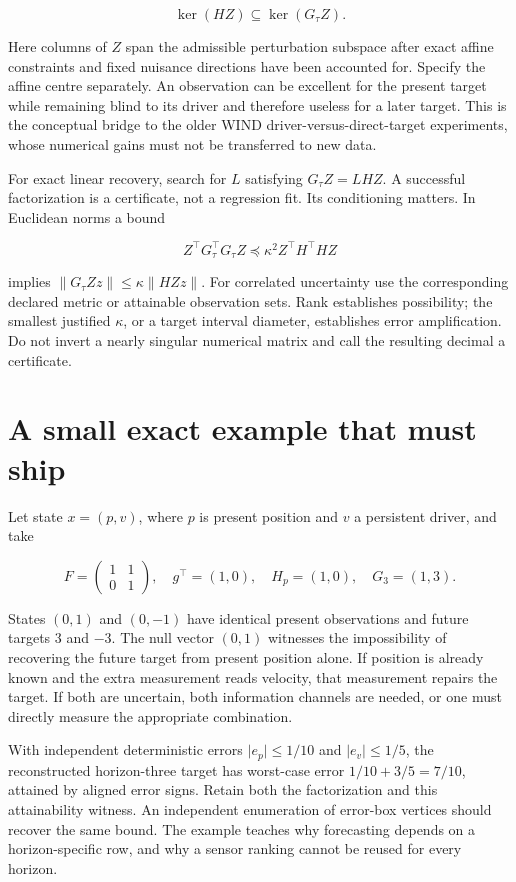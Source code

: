 \documentclass[
  11pt,
  a4paper,
]{report}
\begin{document}
\[
 \boxed{\ker(HZ)\subseteq\ker(G_\tau Z)}.
\]

Here columns of \(Z\) span the admissible perturbation subspace after
exact affine constraints and fixed nuisance directions have been
accounted for. Specify the affine centre separately. An observation can
be excellent for the present target while remaining blind to its driver
and therefore useless for a later target. This is the conceptual bridge
to the older WIND driver-versus-direct-target experiments, whose
numerical gains must not be transferred to new data.

For exact linear recovery, search for \(L\) satisfying \(G_\tau Z=LHZ\).
A successful factorization is a certificate, not a regression fit. Its
conditioning matters. In Euclidean norms a bound

\[
 Z^\top G_\tau^\top G_\tau Z\preceq\kappa^2 Z^\top H^\top HZ
\]

implies \(\lVert G_\tau Zz\rVert\le\kappa\lVert HZz\rVert\). For
correlated uncertainty use the corresponding declared metric or
attainable observation sets. Rank establishes possibility; the smallest
justified \(\kappa\), or a target interval diameter, establishes error
amplification. Do not invert a nearly singular numerical matrix and call
the resulting decimal a certificate.

\hypertarget{a-small-exact-example-that-must-ship}{%
\section{A small exact example that must
ship}\label{a-small-exact-example-that-must-ship}}

Let state \(x=(p,v)\), where \(p\) is present position and \(v\) a
persistent driver, and take

\[
 F=\begin{pmatrix}1&1\\0&1\end{pmatrix},\quad
 g^\top=(1,0),\quad H_p=(1,0),\quad G_3=(1,3).
\]

States \((0,1)\) and \((0,-1)\) have identical present observations and
future targets \(3\) and \(-3\). The null vector \((0,1)\) witnesses the
impossibility of recovering the future target from present position
alone. If position is already known and the extra measurement reads
velocity, that measurement repairs the target. If both are uncertain,
both information channels are needed, or one must directly measure the
appropriate combination.

With independent deterministic errors \(\lvert e_p\rvert\le1/10\) and
\(\lvert e_v\rvert\le1/5\), the reconstructed horizon-three target has
worst-case error \(1/10+3/5=7/10\), attained by aligned error signs.
Retain both the factorization and this attainability witness. An
independent enumeration of error-box vertices should recover the same
bound. The example teaches why forecasting depends on a horizon-specific
row, and why a sensor ranking cannot be reused for every horizon.
\end{document}
